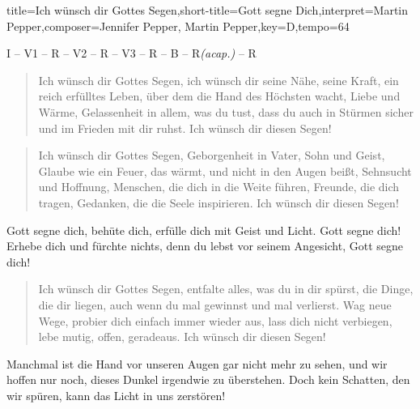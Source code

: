 \documentclass{leadsheet}
\begin{document}
\begin{song}[bridge/numbered=true]{title={Ich wünsch dir Gottes Segen},short-title={Gott segne Dich},interpret={Martin Pepper},composer={Jennifer Pepper, Martin Pepper},key={D},tempo={64}}

\begin{schedule}
I -- V1 -- R -- V2 -- R -- V3 -- R -- B -- R\textit{(acap.)} -- R
\end{schedule}

\begin{intro}
\end{intro}

\begin{verse}
Ich wünsch dir Gottes Segen,
ich wünsch dir seine Nähe, seine Kraft,
ein reich erfülltes Leben,
über dem die Hand des Höchsten wacht,
Liebe und Wärme, Gelassenheit in allem, was du tust,
dass du auch in Stürmen sicher
und im Frieden mit dir ruhst.
Ich wünsch dir diesen Segen!
\end{verse}

\begin{verse}
Ich wünsch dir Gottes Segen,
Geborgenheit in Vater, Sohn und Geist,
Glaube wie ein Feuer, das wärmt,
und nicht in den Augen beißt,
Sehnsucht und Hoffnung, Menschen,
die dich in die Weite führen,
Freunde, die dich tragen,
Gedanken, die die Seele inspirieren.
Ich wünsch dir diesen Segen!
\end{verse}

\begin{chorus}
Gott segne dich, behüte dich,
erfülle dich mit Geist und Licht.
Gott segne dich! Erhebe dich und fürchte nichts,
denn du lebst vor seinem Angesicht, Gott segne dich!
\end{chorus}

\begin{verse}
Ich wünsch dir Gottes Segen,
entfalte alles, was du in dir spürst,
die Dinge, die dir liegen,
auch wenn du mal gewinnst und mal verlierst.
Wag neue Wege,
probier dich einfach immer wieder aus,
lass dich nicht verbiegen,
lebe mutig, offen, geradeaus.
Ich wünsch dir diesen Segen!
\end{verse}

\begin{bridge}
Manchmal ist die Hand
vor unseren Augen gar nicht mehr zu sehen,
und wir hoffen nur noch,
dieses Dunkel irgendwie zu überstehen.
Doch kein Schatten, den wir spüren,
kann das Licht in uns zerstören!
\end{bridge}

\end{song}
\end{document}
